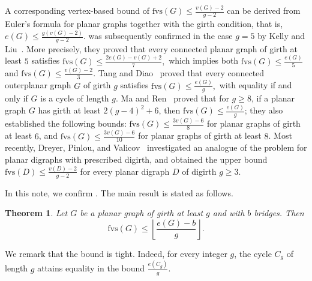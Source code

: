 \documentclass[a4paper,12pt]{article}
\theoremstyle{plain}
\newtheorem{theorem}{Theorem}[section]
\theoremstyle{definition}
\theoremstyle{remark}
\numberwithin{equation}{section}
\begin{document}
A corresponding vertex-based bound of $\mathrm{fvs}(G)\le \frac{v(G)-2}{g-2}$ can be derived from Euler's formula for planar graphs together with the girth condition, that is, $e(G)\leq \frac{g(v(G)-2)}{g-2}$.  
 was subsequently confirmed in the case $g=5$ by Kelly and Liu~\cite{KL2017}. More precisely, they proved that every connected planar graph of girth at least $5$ satisfies $\mathrm{fvs}(G)\le \frac{2e(G)-v(G)+2}{7},$
which implies both $\mathrm{fvs}(G)\le \frac{e(G)}{5}$ and $\mathrm{fvs}(G)\le \frac{v(G)-2}{3}$. Tang and Diao~\cite{TD2025} proved that every connected outerplanar graph $G$ of girth $g$ satisfies
$\mathrm{fvs}(G)\leq \frac{e(G)}{g},$
with equality if and only if $G$ is a cycle of length $g$. Ma and Ren~\cite{MR2025} proved that for $g\ge 8$, if a planar graph $G$ has girth at least $2(g-4)^2+6$, then $\mathrm{fvs}(G)\leq \frac{e(G)}{g}$; they also established the following bounds: $\mathrm{fvs}(G)\leq \frac{3v(G)-6}{8}$ for planar graphs of girth at least $6$, and $\mathrm{fvs}(G)\leq \frac{3v(G)-6}{10}$
for planar graphs of girth at least $8$. %
Most recently, Dreyer, Pinlou, and Valicov~\cite{DPV2026} investigated an analogue of the problem for planar digraphs with prescribed digirth, and obtained the upper bound $\mathrm{fvs}(D)\leq \frac{v(D)-2}{g-2}$ for every planar digraph $D$ of digirth $g\geq 3$.

\medskip
In this note, we confirm . The main result is stated as follows.

\begin{theorem}\label{thm:main}
Let $G$ be a planar graph of girth at least $g$ and with $b$ bridges. Then $$\mathrm{fvs}(G)\leq \left\lfloor \frac{e(G)-b}{g}\right\rfloor.$$ 
\end{theorem}

We remark that the bound is tight. Indeed, for every integer $g$, the cycle $C_g$ of length $g$ attains equality in the bound $\frac{e(C_g)}{g}$.
\end{document}
